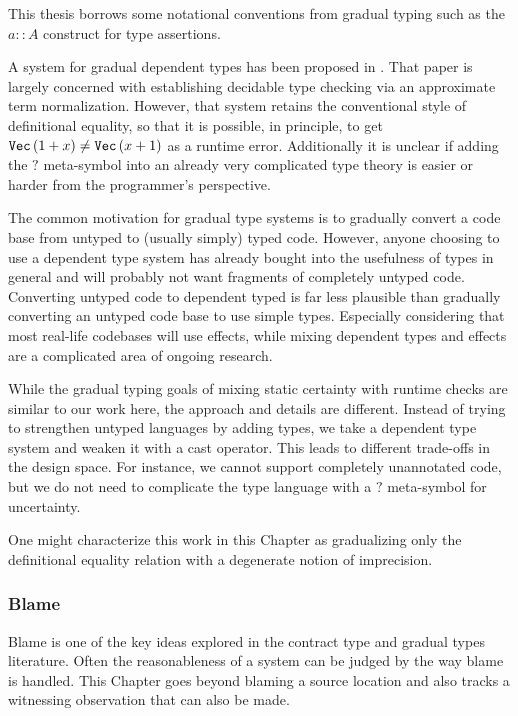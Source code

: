This thesis borrows some notational conventions from gradual typing such as the $a::A$ construct for type assertions.
 
A system for gradual dependent types has been proposed in \cite{10.1145/3341692}.
That paper is largely concerned with establishing decidable type checking via an approximate term normalization.
However, that system retains the conventional style of definitional equality, so that it is possible, in principle, to get $\mathtt{Vec}{}\,(1+x)\neq \mathtt{Vec}{}\,(x+1)$ as a runtime error.
Additionally it is unclear if adding the $?$ meta-symbol into an already very complicated type theory is easier or harder from the programmer's perspective.
 
The common motivation for gradual type systems is to gradually convert a code base from untyped to (usually simply) typed code.
However, anyone choosing to use a dependent type system has already bought into the usefulness of types in general and will probably not want fragments of completely untyped code.
Converting untyped code to dependent typed is far less plausible than gradually converting an untyped code base to use simple types.
Especially considering that most real-life codebases will use effects, while mixing dependent types and effects are a complicated area of ongoing research.
 
While the gradual typing goals of mixing static certainty with runtime checks are similar to our work here, the approach and details are different.
Instead of trying to strengthen untyped languages by adding types, we take a dependent type system and weaken it with a cast operator.
This leads to different trade-offs in the design space.
For instance, we cannot support completely unannotated code, but we do not need to complicate the type language with a $?$ meta-symbol for uncertainty.

One might characterize this work in this Chapter as gradualizing only the definitional equality relation with a degenerate notion of imprecision.
 
\subsubsection{Blame}
 
Blame is one of the key ideas explored in the contract type and gradual types literature\cite{10.1007/978-3-642-00590-9_1,wadler:LIPIcs:2015:5033,10.1145/3110283}.
Often the reasonableness of a system can be judged by the way blame is handled\cite{wadler:LIPIcs:2015:5033}.
This Chapter goes beyond blaming a source location and also tracks a witnessing observation that can also be made.
 
